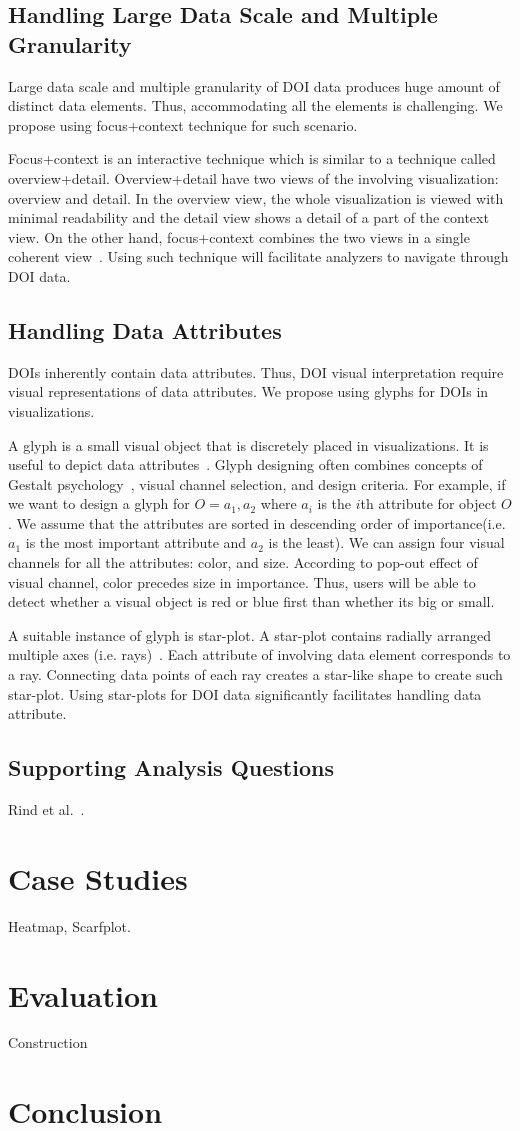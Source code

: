 \subsection{Handling Large Data Scale and Multiple Granularity}
Large data scale and multiple granularity of DOI data produces huge amount of distinct data elements. Thus, accommodating all the elements is challenging. We propose using focus+context technique for such scenario. 

Focus+context is an interactive technique which is similar to a technique called overview+detail. Overview+detail have two views of the involving visualization: overview and detail. In the overview view, the whole visualization is viewed with minimal readability and the detail view shows a detail of a part of the context view. On the other hand, focus+context combines the two views in a single coherent view~\cite{spence1982data}. Using such technique will facilitate analyzers to navigate through DOI data. 

\subsection{Handling Data Attributes}
DOIs inherently contain data attributes. Thus, DOI visual interpretation require visual representations of data attributes. We propose using glyphs for DOIs in visualizations. 

A glyph is a small visual object that is discretely placed in visualizations. It is useful to depict data attributes~\cite{borgo2013glyph}. Glyph designing often combines concepts of Gestalt psychology~\cite{kohler1970gestalt}, visual channel selection, and design criteria. For example, if we want to design a glyph for $O = {a_1, a_2}$ where $a_i$ is the $i$th attribute for object $O$. We assume that the attributes are sorted in descending order of importance(i.e. $a_1$ is the most important attribute and $a_2$ is the least). We can assign four visual channels for all the attributes: color, and size. According to pop-out effect of visual channel, color precedes size in importance. Thus, users will be able to detect whether a visual object is red or blue first than whether its big or small. 

A suitable instance of glyph is star-plot. A star-plot contains radially arranged multiple axes (i.e. rays)~\cite{klippel2009star}. Each attribute of involving data element corresponds to a ray. Connecting data points of each ray creates a star-like shape to create such star-plot. Using star-plots for DOI data significantly facilitates handling data attribute. 

\subsection{Supporting Analysis Questions}
Rind et al.~\cite{Rind15}. 

\section{Case Studies}
Heatmap, Scarfplot. 

\section{Evaluation}
Construction
\section{Conclusion}